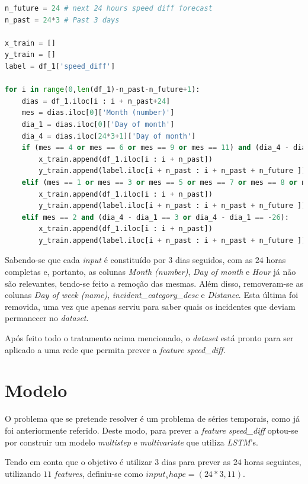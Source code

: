 \documentclass[a4paper, 12pt]{article}
\begin{document}
\begin{lstlisting}[language=Python]
n_future = 24 # next 24 hours speed diff forecast
n_past = 24*3 # Past 3 days

x_train = []
y_train = []
label = df_1['speed_diff']

for i in range(0,len(df_1)-n_past-n_future+1):
	dias = df_1.iloc[i : i + n_past+24]
	mes = dias.iloc[0]['Month (number)']
	dia_1 = dias.iloc[0]['Day of month']
	dia_4 = dias.iloc[24*3+1]['Day of month']
	if (mes == 4 or mes == 6 or mes == 9 or mes == 11) and (dia_4 - dia_1 == 3 or dia_4 - dia_1 == -29):
		x_train.append(df_1.iloc[i : i + n_past])
		y_train.append(label.iloc[i + n_past : i + n_past + n_future ])
	elif (mes == 1 or mes == 3 or mes == 5 or mes == 7 or mes == 8 or mes == 10 or mes == 12) and (dia_4 - dia_1 == 3 or dia_4 - dia_1 == -28):
		x_train.append(df_1.iloc[i : i + n_past])
		y_train.append(label.iloc[i + n_past : i + n_past + n_future ])
	elif mes == 2 and (dia_4 - dia_1 == 3 or dia_4 - dia_1 == -26):
		x_train.append(df_1.iloc[i : i + n_past])
		y_train.append(label.iloc[i + n_past : i + n_past + n_future ])
\end{lstlisting}

Sabendo-se que cada \textit{input} é constituído por $3$ dias seguidos, com as $24$ horas completas e, portanto, as colunas \textit{Month (number)}, \textit{Day of month} e \textit{Hour} já não são relevantes, tendo-se feito a remoção das mesmas. Além disso, removeram-se as colunas \textit{Day of week (name)}, \textit{incident\_category\_desc} e \textit{Distance}. Esta última foi removida, uma vez que apenas serviu para saber quais os incidentes que deviam permanecer no \textit{dataset}.

Após feito todo o tratamento acima mencionado, o \textit{dataset} está pronto para ser aplicado a uma rede que permita prever a \textit{feature speed\_diff}.

\section{Modelo}

O problema que se pretende resolver é um problema de séries temporais, como já foi anteriormente referido. Deste modo, para prever a \textit{feature speed\_diff} optou-se por construir um modelo \textit{multistep} e \textit{multivariate} que utiliza \textit{LSTM}'s.

Tendo em conta que o objetivo é utilizar $3$ dias para prever as $24$ horas seguintes, utilizando $11$ \textit{features}, definiu-se como $input_shape = (24*3,11)$.
\end{document}
